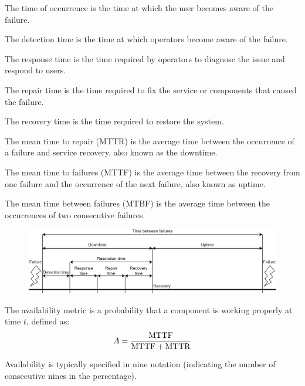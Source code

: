 \begin{definition}
    The time of occurrence is the time at which the user becomes aware of the failure. 
\end{definition}
\begin{definition}
    The detection time is the time at which operators become aware of the failure. 
\end{definition}
\begin{definition}
    The response time is the time required by operators to diagnose the issue and respond to users. 
\end{definition}
\begin{definition}
    The repair time is the time required to fix the service or components that caused the failure. 
\end{definition}
\begin{definition}
    The recovery time is the time required to restore the system. 
\end{definition}
\begin{definition}
    The mean time to repair (MTTR) is the average time between the occurrence of a failure and service recovery, also known as the downtime. 
\end{definition}
\begin{definition}
    The mean time to failures (MTTF) is the average time between the recovery from one failure and the occurrence of the next failure, also known as uptime.
\end{definition}
\begin{definition}
    The mean time between failures (MTBF) is the average time between the occurrences of two consecutive failures. 
\end{definition}
\begin{figure}[H]
    \centering
    \includegraphics[width=0.75\linewidth]{images/fail.png}
\end{figure}
\begin{definition}
    The availability metric is a probability that a component is working properly at time $t$, defined as: 
    \[A=\dfrac{\textnormal{MTTF}}{\textnormal{MTTF}+\textnormal{MTTR}}\]
\end{definition}
Availability is typically specified in nine notation (indicating the number of consecutive nines in the percentage). 

